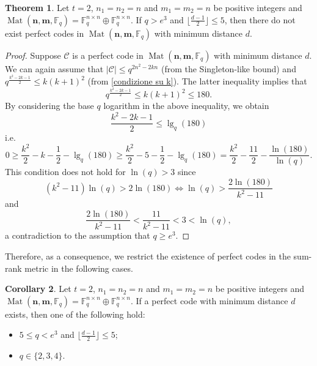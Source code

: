 \documentclass[11pt]{amsart}
\DeclareMathOperator{\Mat}{Mat}
\theoremstyle{definition}
\newtheorem{theorem}{Theorem}[section]
\newtheorem{corollary}[theorem]{Corollary}
\newcommand{\F}{{\mathbb F}}
\newcommand{\bfn}{\mathbf {n}}
\newcommand{\bfm}{\mathbf {m}}
\newcommand{\spacmn}{\Mat(\bfn,\bfm,\F_q)}
\begin{document}
\begin{theorem}\label{thm:nonexistence2t=2}
Let $t=2$, $ n_1 = n_2 = n $ and $ m_1 = m_2 = n $ be positive integers and $\spacmn=\mathbb{F}_q^{n\times n}\oplus\mathbb{F}_q^{n\times n}$. If $q> e^3$ and $\lfloor \frac{d-1}2\rfloor\leq 5$,  then there do not exist perfect codes in $\spacmn$ with minimum distance $d$.
\end{theorem}
\begin{proof}
Suppose $\mathcal{C}$ is a perfect code in $\spacmn$ with minimum distance $d$.
We can again assume that $\lvert \mathcal{C}\rvert\leq q^{2n^2-2kn}$ (from the Singleton-like bound) and $q^{\frac{k^2-2k-1}{2}}\leq k(k+1)^2$ (from \eqref{condizione su k}).
The latter inequality implies that
\[
q^{\frac{k^2-2k-1}{2}}\leq k(k+1)^2\leq 180.
\]
By considering the base $q$ logarithm in the above inequality, we obtain
\[
\frac{k^2-2k-1}{2}\leq \lg_q(180)
\]
i.e.
\[
0\geq \frac{k^2}{2}-k-\frac{1}{2}-\lg_q(180)\geq \frac{k^2}{2}-5-\frac{1}{2}-\lg_q(180)=\frac{k^2}{2}-\frac{11}{2}-\frac{\ln(180)}{\ln(q)}.
\]
This condition does not hold for $\ln(q)>3$ since
\[
(k^2-11)\ln(q)>2\ln(180) \iff \ln(q)>\frac{2\ln(180)}{k^2-11}
\]
and
\[
\frac{2\ln(180)}{k^2-11}<\frac{11}{k^2-11}<3<\ln(q),
\]
a contradiction to the assumption that $q\geq e^3$.


\end{proof}

Therefore, as a consequence, we restrict the existence of perfect codes in the sum-rank metric in the following cases.

\begin{corollary}
    Let $t=2$, $ n_1 = n_2 = n $ and $ m_1 = m_2 = n $ be positive integers and $\spacmn=\mathbb{F}_q^{n\times n}\oplus\mathbb{F}_q^{n\times n}$.
    If a perfect code with minimum distance $d$ exists, then one of the following hold:
    \begin{itemize}
        \item $5 \leq q < e^3$ and $\lfloor \frac{d-1}2\rfloor\leq 5$;
        \item $q\in \{2,3,4\}$.
    \end{itemize}
\end{corollary}
\end{document}
